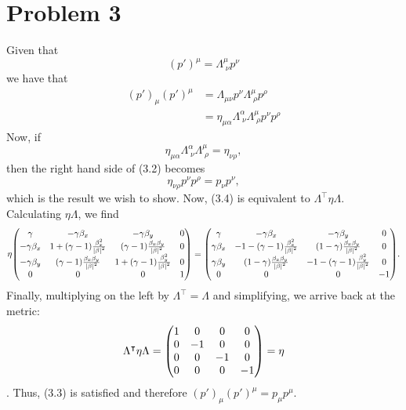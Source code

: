 \documentclass[12pt]{article}
\newcommand{\boostXY}{\mqty(\gamma & -\gamma\beta_x & -\gamma\beta_y & 0 \\ -\gamma\beta_x & 1 + (\gamma - 1)\frac{\beta_x^2}{\abs{\beta}^2} & (\gamma - 1)\frac{\beta_x\beta_y}{\abs{\beta}^2} & 0 \\ -\gamma\beta_y & (\gamma - 1)\frac{\beta_x\beta_y}{\abs{\beta}^2} & 1 + (\gamma - 1)\frac{\beta_y^2}{\abs{\beta}^2} & 0 \\ 0 & 0 & 0 & 1)}
\newcommand{\metric}{\mqty(1 & 0 & 0 & 0 \\ 0 & -1 & 0 & 0 \\ 0 & 0 & -1 & 0 \\ 0 & 0 & 0 & -1)}
\begin{document}
\section*{Problem 3}
Given that
\begin{equation*} \tag{3.1}
    (p')^\mu = \Lambda_{\;\nu}^\mu p^\nu 
\end{equation*}
we have that 
\begin{align*}
    (p')_\mu(p')^\mu &= \Lambda_{\mu\nu}p^\nu \Lambda_{\;\rho}^\mu p^\rho \\
    &= \eta_{\mu\alpha}\Lambda_{\;\nu}^\alpha\Lambda_{\;\rho}^\mu p^\nu p^\rho \tag{3.2}
\end{align*}
Now, if
\begin{equation*} \tag{3.3}
    \eta_{\mu\alpha}\Lambda_{\;\nu}^\alpha\Lambda_{\;\rho}^\mu = \eta_{\nu\rho},
\end{equation*}
then the right hand side of (3.2) becomes
\begin{equation*} \tag{3.4}
    \eta_{\nu\rho} p^\nu p^\rho = p_\nu p^\nu, 
\end{equation*}
which is the result we wish to show. Now, (3.4) is equivalent to $\Lambda^\intercal \eta \Lambda$. Calculating $\eta \Lambda$, we find
\begin{equation*}
    \eta \boostXY = \mqty(\gamma & -\gamma\beta_x & -\gamma\beta_y & 0 \\ \gamma\beta_x & -1 - (\gamma - 1)\frac{\beta_x^2}{\abs{\beta}^2} & (1 - \gamma)\frac{\beta_x\beta_y}{\abs{\beta}^2} & 0 \\ \gamma\beta_y & (1- \gamma)\frac{\beta_x\beta_y}{\abs{\beta}^2} & -1 - (\gamma - 1)\frac{\beta_y^2}{\abs{\beta}^2} & 0 \\ 0 & 0 & 0 & -1).
\end{equation*}
Finally, multiplying on the left by $\Lambda^\intercal = \Lambda$ and simplifying, we arrive back at the metric:
\[ \Lambda^\intercal \eta \Lambda = \metric = \eta \].
Thus, (3.3) is satisfied and therefore $(p')_\mu(p')^\mu = p_\mu p^\mu$.
\end{document}
